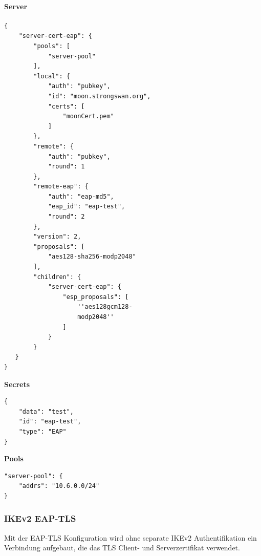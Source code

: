 \begin{minipage}[t]{0.5\textwidth}
\vspace{0pt}
\paragraph{Server}\mbox{}\medskip
\begin{lstlisting}[style=BashInputStyle]
{
    "server-cert-eap": {
        "pools": [
            "server-pool"
        ],
        "local": {
            "auth": "pubkey",
            "id": "moon.strongswan.org",
            "certs": [
                "moonCert.pem"
            ]
        },
        "remote": {
            "auth": "pubkey",
            "round": 1
        },
        "remote-eap": {
            "auth": "eap-md5",
            "eap_id": "eap-test",
            "round": 2
        },
        "version": 2,
        "proposals": [
            "aes128-sha256-modp2048"
        ],
        "children": {
            "server-cert-eap": {
                "esp_proposals": [
                    ''aes128gcm128-
                    modp2048''
                ]
            }
        }
   }
}
\end{lstlisting}
\hspace*{18pt}\textbf{Secrets}\mbox{}\medskip
\begin{lstlisting}[style=BashInputStyle]
{   
    "data": "test",
    "id": "eap-test",
    "type": "EAP"   
}
\end{lstlisting}
\hspace*{18pt}\textbf{Pools}\mbox{}\medskip
\begin{lstlisting}[style=BashInputStyle]
"server-pool": {
    "addrs": "10.6.0.0/24"
}
\end{lstlisting}
\end{minipage}
\nolinebreak
\nopagebreak
\subsubsection{IKEv2 EAP-TLS}
Mit der EAP-TLS Konfiguration wird ohne separate IKEv2 Authentifikation ein Verbindung aufgebaut, die das TLS Client- und Serverzertifikat verwendet.\\


